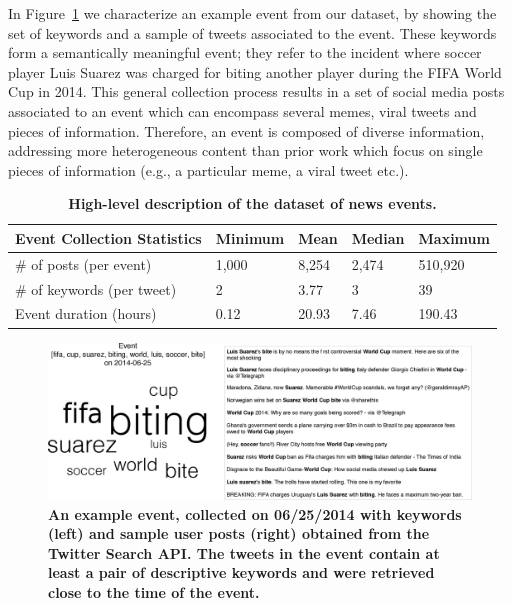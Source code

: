 \documentclass[10pt,letterpaper]{article}
\begin{document}
In Figure~\ref{fig:fig2} we characterize an example event from our
dataset, by showing the set of keywords and a sample of tweets
associated to the event. These keywords form a semantically meaningful
event; they refer to the incident where soccer player Luis Suarez was
charged for biting another player during the FIFA World Cup in
2014. This general collection process results in a set of social media
posts associated to an event which can encompass several memes, viral
tweets and pieces of information. Therefore, an event is composed of
diverse information, addressing more heterogeneous content than prior
work
\cite{Castillo:2014,Szabo:2010,Lerman:2010,Tatar:2011,Pinto:2013,Ahmed:2013,suh2010want}
which focus on single pieces of information (e.g., a
particular meme, a viral tweet etc.).
\begin{table}
  \centering
  \begin{tabularx}{\textwidth}{@{}p{6cm}llll@{}}
    \toprule
    \textbf{Event Collection Statistics} & \textbf{Minimum} & \textbf{Mean} & \textbf{Median} & \textbf{Maximum} \\ \midrule
    \# of posts (per event) & 1,000 & 8,254 & 2,474 & 510,920 \\
    \# of keywords (per tweet) & 2 & 3.77 & 3 & 39 \\
    Event duration (hours) & 0.12 & 20.93 & 7.46 & 190.43 \\ \bottomrule
  \end{tabularx}
  \caption{\bf High-level description of the dataset of news events.} \label{table:dataset-stats}
\end{table}

\begin{figure}
    \includegraphics[width=\textwidth]{figures/plots_revision/fig2}
  \caption{\textbf{An example event, collected on 06/25/2014
      with keywords (left) and sample user posts (right) obtained
      from the Twitter Search API. The tweets in the event contain at
      least a pair of descriptive keywords and were retrieved close to the time
      of the event.}}
  \label{fig:fig2}
\end{figure}
\end{document}
